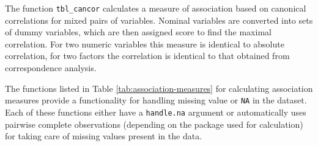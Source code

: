 The function \texttt{tbl\_cancor} calculates a measure of association
based on canonical correlations for mixed pairs of variables. Nominal
variables are converted into sets of dummy variables, which are then
assigned score to find the maximal correlation. For two numeric
variables this measure is identical to absolute correlation, for two
factors the correlation is identical to that obtained from
correspondence analysis.

The functions listed in Table \ref{tab:association-measures} for
calculating association measures provide a functionality for handling
missing value or \texttt{NA} in the dataset. Each of these functions
either have a \texttt{handle.na} argument or automatically uses pairwise
complete observations (depending on the package used for calculation)
for taking care of missing values present in the data.

\begin{Schunk}
\begin{table}

\caption{\label{tab:association-measures}List of the functions available in the package for calculating different association measures along with the packages used for calculation.}
\centering
{}
\end{table}

\end{Schunk}

